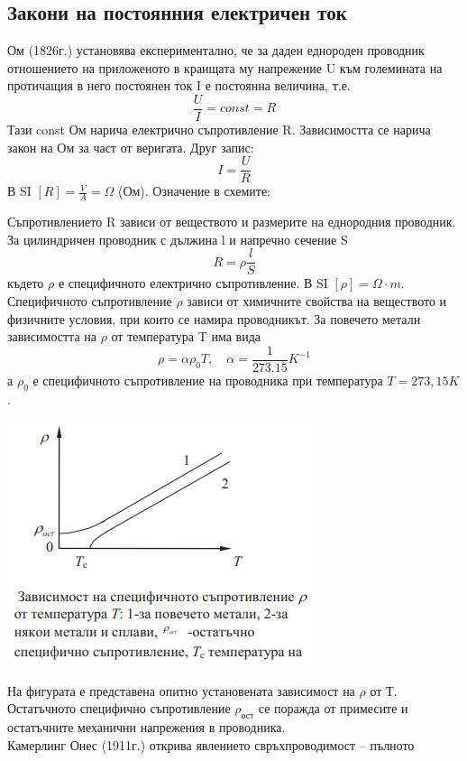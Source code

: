 \documentclass[fleqn, 12pt]{article}
\theoremstyle{definition}
\begin{document}
\subsection{Закони на постоянния електричен ток}
Ом (1826г.) установява експериментално, че за даден еднороден проводник
отношението на приложеното в краищата му напрежение U към големината на
протичащия в него постоянен ток I е постоянна величина, т.е. 
$$\frac{U}{I} = const = R$$
Тази const Ом нарича електрично съпротивление R. Зависимостта се нарича закон на
Ом за част от веригата. Друг запис:
$$I = \frac{U}{R}$$
В SI $[R] = \frac{V}{A} = \Omega$ (Ом). Означение в схемите:
\begin{center}
\end{center}
Съпротивлението R зависи от веществото и размерите на еднородния проводник.
За цилиндричен проводник с дължина l и напречно сечение S
$$R = \rho \frac{l}{S}$$
където $\rho$ е специфичното електрично съпротивление. В SI $[\rho] = \Omega \cdot m$.\\
Специфичното съпротивление $\rho$ зависи от химичните свойства на веществото и
физичните условия, при които се намира проводникът. За повечето
метали зависимостта на $\rho$ от температура T има вида 
$$\rho = \alpha \rho_0 T, \quad \alpha = \frac{1}{273.15} K^{-1}$$
а $\rho_0$ е специфичното съпротивление на проводника при температура $T = 273,15 K$.
\begin{center}
  \includegraphics{Pics/physics/lec7-1-1.png}
\end{center}
На фигурата е представена
опитно установената зависимост на $\rho$
от Т. Остатъчното специфично съпротивление $\rho_{\text{ост}}$ 
се поражда от примесите и остатъчните механични напрежения в проводника. \\
Камерлинг Онес (1911г.) открива явлението свръхпроводимост – пълното
\end{document}
